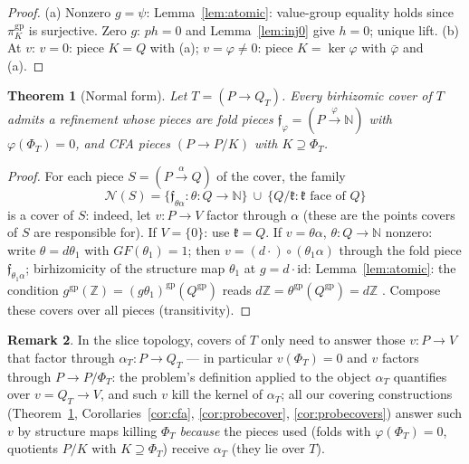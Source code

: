 \documentclass[11pt]{article}
\newtheorem{theorem}{Theorem}[section]
\theoremstyle{definition}
\newtheorem{remark}[theorem]{Remark}
\newcommand{\gp}{\mathrm{gp}}
\newcommand{\Z}{\mathbb{Z}}
\begin{document}
\begin{proof}
(a) Nonzero $g=\psi$: Lemma~\ref{lem:atomic}: value-group equality
holds since $\pi_K^{\gp}$ is surjective. Zero $g$: $ph=0$ and
Lemma~\ref{lem:inj0} give $h=0$; unique lift.
(b) At $v$: $v=0$: piece $K=Q$ with (a); $v=\varphi\ne0$: piece
$K=\ker\varphi$ with $\bar\varphi$ and (a).
\end{proof}

\begin{theorem}[Normal form]\label{thm:normalform}
Let $T=(P\to Q_T)$. Every birhizomic cover of $T$ admits a refinement
whose pieces are fold pieces $\mathfrak f_\varphi=
(P\xrightarrow{\varphi}\mathbb N)$ with $\varphi(\Phi_T)=0$, and CFA
pieces $(P\to P/K)$ with $K\supseteq\Phi_T$.
\end{theorem}

\begin{proof}
For each piece $S=(P\xrightarrow{\alpha}Q)$ of the cover, the family
\[
\mathcal N(S)=
\{\mathfrak f_{\theta\alpha}:\theta:Q\to\mathbb N\}
\ \cup\ \{Q/\mathfrak k:\mathfrak k\text{ face of }Q\}
\]
is a cover of $S$: indeed, let $v:P\to V$ factor through
$\alpha$ (these are the points covers of $S$ are responsible for).
If $V=\{0\}$: use $\mathfrak k=Q$. If $v=\theta\alpha$,
$\theta:Q\to\mathbb N$ nonzero: write $\theta=d\theta_1$ with
${GF}(\theta_1)=1$; then $v=(d\cdot)\circ(\theta_1\alpha)$ through
the fold piece $\mathfrak f_{\theta_1\alpha}$; birhizomicity of the
structure map $\theta_1$ at $g=d\cdot\mathrm{id}$:
Lemma~\ref{lem:atomic}: the condition
$g^{\gp}(\Z)=(g\theta_1)^{\gp}(Q^{\gp})$ reads
$d\Z=\theta^{\gp}(Q^{\gp})=d\Z$ \checkmark. Compose these covers over all
pieces (transitivity).
\end{proof}

\begin{remark}\label{rem:cover-points}
In the slice topology, covers of $T$ only need to answer those
$v:P\to V$ that factor through $\alpha_T:P\to Q_T$ --- in
particular $v(\Phi_T)=0$ and $v$ factors through
$P\to P/\Phi_T$: the problem's definition applied to the object
$\alpha_T$ quantifies over $v=Q_T\to V$, and such $v$ kill the
kernel of $\alpha_T$; all our covering constructions
(Theorem~\ref{thm:normalform}, Corollaries~\ref{cor:cfa},
\ref{cor:probecover}, \ref{cor:probecovers}) answer such $v$ by
structure maps killing $\Phi_T$ \emph{because} the pieces used
(folds with $\varphi(\Phi_T)=0$, quotients $P/K$ with
$K\supseteq\Phi_T$) receive $\alpha_T$ (they lie over $T$).
\end{remark}
\end{document}
